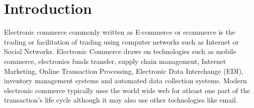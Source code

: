 \documentclass[hidelinks,a4paper,12pt]{article}
\begin{document}

\newpage
	
\tableofcontents
	
\setcounter{tocdepth}{3}
	
	
\newpage

\clearpage

\pagestyle{plain}
\setcounter{page}{1}


\section{Introduction}
Electronic commerce commonly written as E-commerce or ecommerce is the trading or facilitation of trading using computer networks such as Internet or Social Networks. Electronic Commerce draws on technologies such as mobile commerce, electronics funds transfer, supply chain management, Internet Marketing, Online Transaction Processing, Electronic Data Interchange (EDI), inventory management systems and automated data collection systems. Modern electronic commerce typically uses the world wide web for atleast one part of the transaction's life cycle although it may also use other technologies like email.
\\
\end{document}
